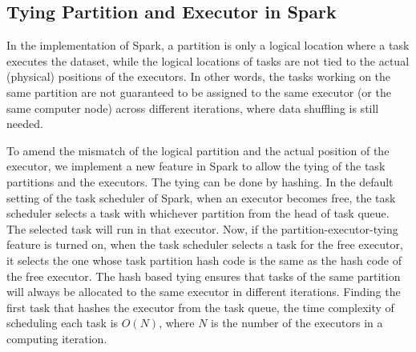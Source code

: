 \documentclass[10pt,journal,compsoc]{IEEEtran}
\begin{document}
\subsection{Tying Partition and Executor in Spark}
In the implementation of Spark, a partition is only a logical location
where a task executes the dataset, while the logical locations of
tasks are not tied to the actual (physical) positions of the
executors.
In other words, %
the tasks working on the same partition are not guaranteed to be
assigned to the same executor (or the same computer node) across
different iterations, where data shuffling is still needed.

To amend the mismatch of the logical partition and the actual position
of the executor, we implement a new feature in Spark to allow the
tying of the task partitions and the executors.
The tying can be done by hashing. %
In the default setting of the task scheduler of Spark, when an executor
becomes free, the task scheduler selects a task with whichever partition
from the head of task queue. The selected task will run in that
executor.
Now, if the partition-executor-tying feature is turned on, when the task scheduler selects a task for the free executor, 
it selects the one whose task partition hash code is the same as the hash code of the free executor. 
The hash based tying ensures that tasks of the same partition will always be allocated to the same executor in different iterations. 
Finding the first task that hashes the executor from the task queue, 
the time complexity of scheduling each task is $O(N)$, 
where $N$ is the number of the executors in a computing iteration. 
\end{document}
